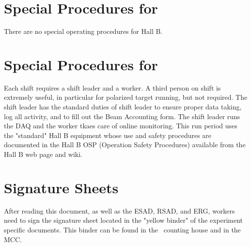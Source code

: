 %
\newpage
\section{Special Procedures for \HALL}

There are no special operating procedures for Hall B.

%
\newpage
\section{Special Procedures for \EXPTS}

Each shift requires a shift leader and a worker.  
A third person on shift is extremely useful, in particular for polarized target running, but not required. The shift leader 
has the standard
duties of shift leader to ensure proper data taking, log all activity, and to fill out
the Beam Accounting form.  The shift leader  runs the DAQ and the worker tkaes care of online monitoring.
This run period uses the "standard" Hall B equipment whose
use and safety procedures are documented in the Hall B OSP (Operation Safety
Procedures) available from the Hall B web page and wiki.


\newpage
\section{Signature Sheets}

After reading this document, as well as the ESAD, RSAD, and ERG, workers need to sign
the signature sheet located in the "yellow binder" of the experiment specific documents.
This binder can be found in the \HALL\ counting house and in the MCC.

